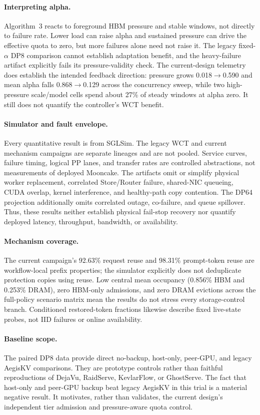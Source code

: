 \paragraph{Interpreting alpha.}
Algorithm~3 reacts to foreground HBM pressure and stable windows, not directly
to failure rate.  Lower load can raise alpha and sustained pressure can drive
the effective quota to zero, but more failures alone need not raise it.  The
legacy fixed-$\alpha$ DP8 comparison cannot establish adaptation benefit, and
the heavy-failure artifact explicitly fails its pressure-validity check.  The
current-design telemetry does establish the intended feedback direction:
pressure grows 0.018$\rightarrow$0.590 and mean alpha falls
0.868$\rightarrow$0.129 across the concurrency sweep, while two high-pressure
scale/model cells spend about 27\% of steady windows at alpha zero.  It still
does not quantify the controller's WCT benefit.

\paragraph{Simulator and fault envelope.}
Every quantitative result is from SGLSim.  The legacy WCT and current
mechanism campaigns are separate lineages and are not pooled.  Service curves, failure timing,
logical PP lanes, and transfer rates are controlled abstractions, not
measurements of deployed Mooncake.  The artifacts omit or simplify physical
worker replacement, correlated Store/Router failure, shared-NIC queueing,
CUDA overlap, kernel interference, and healthy-path copy contention.  The
DP64 projection additionally omits correlated outage, co-failure, and queue
spillover.  Thus, these results neither establish physical fail-stop recovery
nor quantify deployed latency, throughput, bandwidth, or availability.

\paragraph{Mechanism coverage.}
The current campaign's 92.63\% request reuse and 98.31\% prompt-token reuse are
workflow-local prefix properties; the simulator explicitly does not
deduplicate protection copies using reuse.  Low central mean occupancy
(0.856\% HBM and 0.253\% DRAM), zero HBM-only admissions, and zero DRAM
evictions across the full-policy scenario matrix mean the results do not
stress every storage-control branch.  Conditioned restored-token fractions
likewise describe fixed live-state probes, not IID failures or online
availability.

\paragraph{Baseline scope.}
The paired DP8 data provide direct no-backup, host-only, peer-GPU, and legacy
AegisKV comparisons.  They are prototype controls rather than faithful
reproductions of DejaVu, RaidServe, KevlarFlow, or GhostServe.  The fact that
host-only and peer-GPU backup beat legacy AegisKV in this trial is a material
negative result.  It motivates, rather than validates, the current design's
independent tier admission and pressure-aware quota control.

